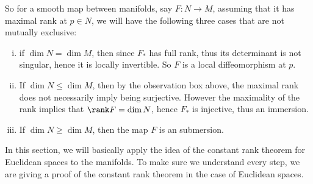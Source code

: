 So for a smooth map between manifolds, say $ F: N\to M $, assuming that it has maximal rank at $ p \in N $, we will have the following three cases that are not mutually exclusive:
\begin{enumerate}[(i)]
	\item if $ \dim N = \dim M $, then since $ F_* $ has full rank, thus its determinant is not singular, hence it is locally invertible. So $ F $ is a local diffeomorphism at $ p $.
	\item If $ \dim N \leq \dim M $, then by the observation box above, the maximal rank does not necessarily imply being surjective. However the maximality of the rank implies that $ \rank F = \dim N $, hence $ F_* $ is injective, thus an immersion.
	\item If $ \dim N \geq \dim M $, then the map $ F $ is an submersion.
\end{enumerate}

In this section, we will basically apply the idea of the constant rank theorem for Euclidean spaces to the manifolds. To make sure we understand every step, we are giving a proof of the constant rank theorem in the case of Euclidean spaces. 

